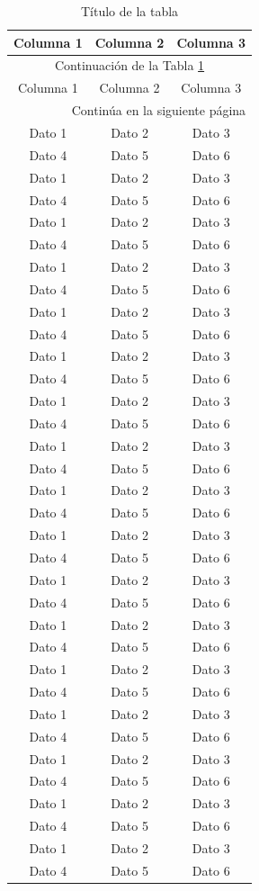\documentclass[b5paper, 10pt]{book}
\begin{document}
\begin{longtable}{ccc}
	\caption{Título de la tabla}\label{tab:ejemplo} \\
	
	\toprule
	Columna 1 & Columna 2 & Columna 3 \\
	\midrule
	\endfirsthead
	
	\multicolumn{3}{c}{Continuación de la Tabla \ref{tab:ejemplo}} \\
	\toprule
	Columna 1 & Columna 2 & Columna 3 \\
	\midrule
	\endhead
	
	\midrule
	\multicolumn{3}{r}{Continúa en la siguiente página} \\
	\endfoot
	
	\bottomrule
	\endlastfoot
	
	Dato 1 & Dato 2 & Dato 3 \\
	Dato 4 & Dato 5 & Dato 6 \\
		Dato 1 & Dato 2 & Dato 3 \\
	Dato 4 & Dato 5 & Dato 6 \\
		Dato 1 & Dato 2 & Dato 3 \\
	Dato 4 & Dato 5 & Dato 6 \\
		Dato 1 & Dato 2 & Dato 3 \\
	Dato 4 & Dato 5 & Dato 6 \\
		Dato 1 & Dato 2 & Dato 3 \\
	Dato 4 & Dato 5 & Dato 6 \\
		Dato 1 & Dato 2 & Dato 3 \\
	Dato 4 & Dato 5 & Dato 6 \\
		Dato 1 & Dato 2 & Dato 3 \\
	Dato 4 & Dato 5 & Dato 6 \\
		Dato 1 & Dato 2 & Dato 3 \\
	Dato 4 & Dato 5 & Dato 6 \\
		Dato 1 & Dato 2 & Dato 3 \\
	Dato 4 & Dato 5 & Dato 6 \\
		Dato 1 & Dato 2 & Dato 3 \\
	Dato 4 & Dato 5 & Dato 6 \\
		Dato 1 & Dato 2 & Dato 3 \\
	Dato 4 & Dato 5 & Dato 6 \\
		Dato 1 & Dato 2 & Dato 3 \\
	Dato 4 & Dato 5 & Dato 6 \\
			Dato 1 & Dato 2 & Dato 3 \\
	Dato 4 & Dato 5 & Dato 6 \\
		Dato 1 & Dato 2 & Dato 3 \\
	Dato 4 & Dato 5 & Dato 6 \\
		Dato 1 & Dato 2 & Dato 3 \\
	Dato 4 & Dato 5 & Dato 6 \\
		Dato 1 & Dato 2 & Dato 3 \\
	Dato 4 & Dato 5 & Dato 6 \\
		Dato 1 & Dato 2 & Dato 3 \\
	Dato 4 & Dato 5 & Dato 6 \\
\end{longtable}
	
\end{document}
